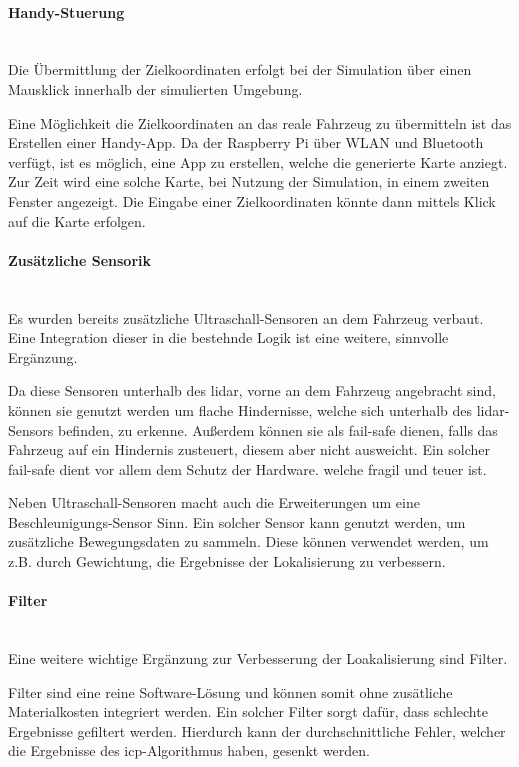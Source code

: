 \paragraph{Handy-Stuerung} \mbox{}\\
Die Übermittlung der Zielkoordinaten erfolgt bei der Simulation über einen Mausklick innerhalb der simulierten Umgebung.

Eine Möglichkeit die Zielkoordinaten an das reale Fahrzeug zu übermitteln ist das Erstellen einer Handy-App.
Da der Raspberry Pi über WLAN und Bluetooth verfügt, ist es möglich, eine App zu erstellen, welche die generierte Karte anziegt.
Zur Zeit wird eine solche Karte, bei Nutzung der Simulation, in einem zweiten Fenster angezeigt.
Die Eingabe einer Zielkoordinaten könnte dann mittels Klick auf die Karte erfolgen.

\paragraph{Zusätzliche Sensorik} \mbox{}\\
Es wurden bereits zusätzliche Ultraschall-Sensoren an dem Fahrzeug verbaut.
Eine Integration dieser in die bestehnde Logik ist eine weitere, sinnvolle Ergänzung.

Da diese Sensoren unterhalb des \ac{lidar}, vorne an dem Fahrzeug angebracht sind,
können sie genutzt werden um flache Hindernisse, welche sich unterhalb des \ac{lidar}-Sensors befinden, zu erkenne.
Außerdem können sie als fail-safe dienen, falls das Fahrzeug auf ein Hindernis zusteuert, diesem aber nicht ausweicht.
Ein solcher fail-safe dient vor allem dem Schutz der Hardware. welche fragil und teuer ist.

Neben Ultraschall-Sensoren macht auch die Erweiterungen um eine Beschleunigungs-Sensor Sinn.
Ein solcher Sensor kann genutzt werden, um zusätzliche Bewegungsdaten zu sammeln.
Diese können verwendet werden, um z.B. durch Gewichtung, die Ergebnisse der Lokalisierung zu verbessern.

\paragraph{Filter} \mbox{}\\
Eine weitere wichtige Ergänzung zur Verbesserung der Loakalisierung sind Filter.

Filter sind eine reine Software-Lösung und können somit ohne zusätliche Materialkosten integriert werden.
Ein solcher Filter sorgt dafür, dass schlechte Ergebnisse gefiltert werden.
Hierdurch kann der durchschnittliche Fehler, welcher die Ergebnisse des \ac{icp}-Algorithmus haben, gesenkt werden.

\newpage
